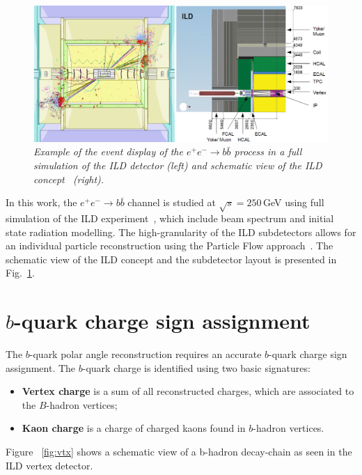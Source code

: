 \documentclass{PoS}
\begin{document}
\begin{figure}
	{\centering
		\includegraphics[width=0.8\linewidth]{../poster/figures/ild3.png}
		\caption{\sl Example of the event display of the $e^+ e^-\to b\bar{b}$ process in a full simulation of the ILD detector (left) and schematic view of the ILD concept~\cite{Behnke:2013lya} (right). }
		\label{fig:ILDScheme}
	}
\end{figure}

In this work, the $e^+ e^-\to b\bar{b}$ channel is studied at $\sqrt{s}=250$\,GeV using full simulation of the ILD experiment~\cite{Behnke:2013lya}, which include beam spectrum and initial state radiation modelling.
The high-granularity of the ILD subdetectors allows for an individual particle reconstruction using the Particle Flow approach~\cite{Marshall:2015rfa}.
The schematic view of the ILD concept and the subdetector layout is presented in Fig.~\ref{fig:ILDScheme}.



\section{$b$-quark charge sign assignment}

The $b$-quark polar angle reconstruction requires an accurate $b$-quark charge sign assignment. 
The $b$-quark charge is identified using two basic signatures:
\begin{itemize}
	\item \textbf{Vertex charge} is a sum of all reconstructed charges, which are associated to the $B$-hadron vertices;
	\item \textbf{Kaon charge} is a charge of charged kaons found in $b$-hadron vertices. 
\end{itemize}

Figure ~\ref{fig:vtx} shows a schematic view of a b-hadron decay-chain as seen in the ILD vertex detector.
\end{document}
